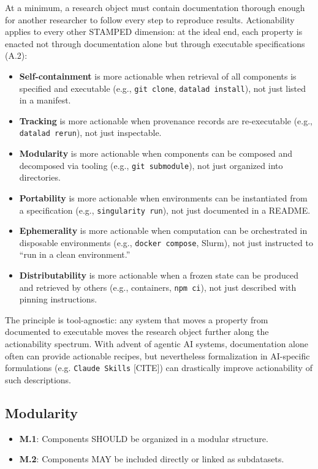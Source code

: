 \documentclass{article}
\begin{document}
At a minimum, a research object must contain documentation thorough enough for another researcher to follow every step to reproduce results.
Actionability applies to every other STAMPED dimension: at the ideal end, each property is enacted not through documentation alone but through executable specifications (A.2):
\begin{itemize}
  \item \textbf{Self-containment} is more actionable when retrieval of all components is specified and executable (e.g., \texttt{git clone}, \texttt{datalad install}), not just listed in a manifest.
  \item \textbf{Tracking} is more actionable when provenance records are re-executable (e.g., \texttt{datalad rerun}), not just inspectable.
  \item \textbf{Modularity} is more actionable when components can be composed and decomposed via tooling (e.g., \texttt{git submodule}), not just organized into directories.
  \item \textbf{Portability} is more actionable when environments can be instantiated from a specification (e.g., \texttt{singularity run}), not just documented in a README.
  \item \textbf{Ephemerality} is more actionable when computation can be orchestrated in disposable environments (e.g., \texttt{docker compose}, Slurm), not just instructed to ``run in a clean environment.''
  \item \textbf{Distributability} is more actionable when a frozen state can be produced and retrieved by others (e.g., containers, \texttt{npm ci}), not just described with pinning instructions.
\end{itemize}
The principle is tool-agnostic: any system that moves a property from documented to executable moves the research object further along the actionability spectrum.
With advent of agentic AI systems, documentation alone often can provide actionable recipes, but nevertheless formalization in AI-specific formulations (e.g. \texttt{Claude Skills} [CITE]) can drastically improve actionability of such descriptions.



\subsection{Modularity}

\begin{itemize}
    \item \textbf{M.1}: Components SHOULD be organized in a modular structure.
    \item \textbf{M.2}: Components MAY be included directly or linked as subdatasets.
\end{itemize}
\end{document}
